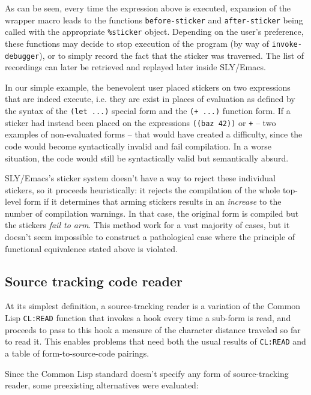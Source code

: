 \documentclass[sigconf]{acmart}
\begin{document}
As can be seen, every time the expression above is executed, expansion
of the wrapper macro leads to the functions \texttt{before-sticker}
and \texttt{after-sticker} being called with the appropriate
\texttt{\%sticker} object.  Depending on the user's preference, these
functions may decide to stop execution of the program (by way of
\texttt{invoke-debugger}), or to simply record the fact that the
sticker was traversed.  The list of recordings can later be retrieved
and replayed later inside SLY/Emacs.

In our simple example, the benevolent user placed stickers on two
expressions that are indeed execute, i.e. they are exist in places of
evaluation as defined by the syntax of the \texttt{(let ...)}  special
form and the \texttt{(+ ...)} function form.  If a sticker had instead
been placed on the expressions \texttt{((baz 42))} or \texttt{+} --
two examples of non-evaluated forms -- that would have created a
difficulty, since the code would become syntactically invalid and fail
compilation.  In a worse situation, the code would still be
syntactically valid but semantically absurd.

SLY/Emacs's sticker system doesn't have a way to reject these
individual stickers, so it proceeds heuristically: it rejects the
compilation of the whole top-level form if it determines that arming
stickers results in an \emph{increase} to the number of compilation
warnings.  In that case, the original form is compiled but the
stickers \emph{fail to arm}.  This method work for a vast majority of
cases, but it doesn't seem impossible to construct a pathological case
where the principle of functional equivalence stated above is
violated.

\subsection{Source tracking code reader}\label{st-reader}

At its simplest definition, a source-tracking reader is a variation of
the Common Lisp \texttt{CL:READ} function that invokes a hook every
time a sub-form is read, and proceeds to pass to this hook a measure
of the character distance traveled so far to read it.  This enables
problems that need both the usual results of \texttt{CL:READ} and a
table of form-to-source-code pairings.

Since the Common Lisp standard doesn't specify any form of
source-tracking reader, some preexisting alternatives were evaluated:
\end{document}
